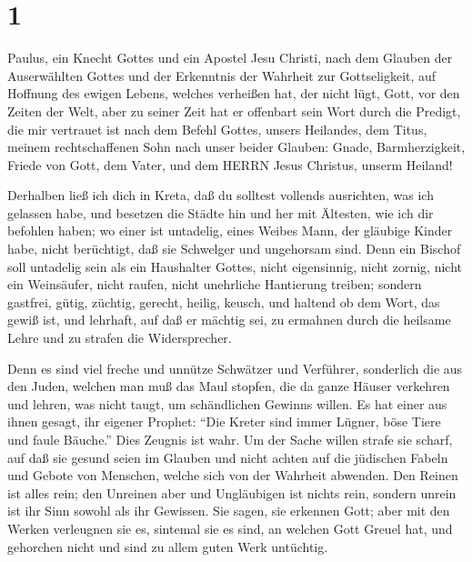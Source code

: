 \hypertarget{section}{%
\section{1}\label{section}}

 Paulus, ein Knecht Gottes und ein Apostel Jesu Christi,
nach dem Glauben der Auserwählten Gottes und der Erkenntnis der Wahrheit
zur Gottseligkeit,  auf Hoffnung des ewigen Lebens, welches
verheißen hat, der nicht lügt, Gott, vor den Zeiten der Welt,
 aber zu seiner Zeit hat er offenbart sein Wort durch die
Predigt, die mir vertrauet ist nach dem Befehl Gottes, unsers Heilandes,
 dem Titus, meinem rechtschaffenen Sohn nach unser beider
Glauben: Gnade, Barmherzigkeit, Friede von Gott, dem Vater, und dem
HERRN Jesus Christus, unserm Heiland!

 Derhalben ließ ich dich in Kreta, daß du solltest vollends
ausrichten, was ich gelassen habe, und besetzen die Städte hin und her
mit Ältesten, wie ich dir befohlen haben;  wo einer ist
untadelig, eines Weibes Mann, der gläubige Kinder habe, nicht
berüchtigt, daß sie Schwelger und ungehorsam sind.  Denn ein
Bischof soll untadelig sein als ein Haushalter Gottes, nicht
eigensinnig, nicht zornig, nicht ein Weinsäufer, nicht raufen, nicht
unehrliche Hantierung treiben;  sondern gastfrei, gütig,
züchtig, gerecht, heilig, keusch,  und haltend ob dem Wort,
das gewiß ist, und lehrhaft, auf daß er mächtig sei, zu ermahnen durch
die heilsame Lehre und zu strafen die Widersprecher.

 Denn es sind viel freche und unnütze Schwätzer und
Verführer, sonderlich die aus den Juden,  welchen man muß
das Maul stopfen, die da ganze Häuser verkehren und lehren, was nicht
taugt, um schändlichen Gewinns willen.  Es hat einer aus
ihnen gesagt, ihr eigener Prophet: ``Die Kreter sind immer Lügner, böse
Tiere und faule Bäuche.''  Dies Zeugnis ist wahr. Um der
Sache willen strafe sie scharf, auf daß sie gesund seien im Glauben
 und nicht achten auf die jüdischen Fabeln und Gebote von
Menschen, welche sich von der Wahrheit abwenden.  Den
Reinen ist alles rein; den Unreinen aber und Ungläubigen ist nichts
rein, sondern unrein ist ihr Sinn sowohl als ihr Gewissen. 
Sie sagen, sie erkennen Gott; aber mit den Werken verleugnen sie es,
sintemal sie es sind, an welchen Gott Greuel hat, und gehorchen nicht
und sind zu allem guten Werk untüchtig.

